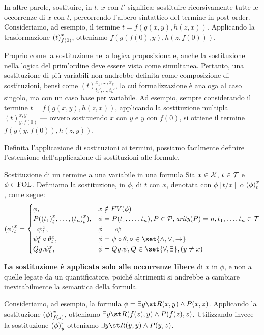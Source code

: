 In altre parole, sostituire, in \(t\), \(x\) con \(t'\) significa: sostituire ricorsivamente tutte le occorrenze di \(x\) con \(t\), percorrendo l'albero sintattico del termine in post-order. 
Consideriamo, ad esempio, il termine \(t = f(g(x,y), h(z,x))\). Applicando la trasformazione \({{\left(t\right)}^{x}_{f(0)}}\), otteniamo \(f(g(f(0),y), h(z,f(0)))\).

Proprio come la sostituzione nella logica proposizionale, anche la sostituzione nella logica del prim'ordine deve essere vista come simultanea.
Pertanto, una sostituzione di più variabili non andrebbe definita come composizione di sostituzioni, bensì come \({(t)}^{x_1,\ldots,x_k}_{t_1',\ldots,t_k'}\), la cui formalizzazione è analoga al caso singolo, ma con un caso base per variabile. 
Ad esempio, sempre considerando il termine \(t = f(g(x,y), h(z,x))\), applicando la sostituzione multipla \({(t)}^{x,y}_{y,f(0)}\) --- ovvero sostituendo \(x\) con \(y\) e \(y\) con \(f(0)\), si ottiene il termine \(f(g(y,f(0)), h(z,y))\).

Definita l'applicazione di sostituzioni ai termini, possiamo facilmente definire l'estensione dell'applicazione di sostituzioni alle formule.

\begin{definition}{Sostituzione di un termine a una variabile in una formula}
  Sia \(x\in\mathcal{X}\), \(t\in\mathcal{T}\) e \(\phi\in\FOL\). Definiamo la sostituzione, in \(\phi\), di \(t\) con \(x\), denotata con \(\phi[t/x]\) o \({{\left(\phi\right)}^{x}_{t}}\), come segue:
  \[\subs{\phi}{x}{t} = \begin{cases}
    \phi, & x \notin FV(\phi)\\
    P({(t_1)}^x_{t}, \ldots, {(t_n)}^x_{t}), & \phi = P(t_1,\ldots,t_n), P\in\PredSyms, \arty(P)=n, t_1,\ldots,t_n \in \Terms\\
    \neg {\psi}^x_{t}, & \phi = \neg \psi\\
    {\psi}^x_{t}\circ{\theta}^x_{t}, & \phi = \psi\circ\theta, \circ\in\set{\land,\lor,\to}\\
    Q y. {\psi}^x_{t}, & \phi = Q y. \psi, Q\in\set{\forall,\exists}, (y\neq x)
  \end{cases}\]
\end{definition}

\textbf{La sostituzione è applicata solo alle occorrenze libere} di \(x\) in \(\phi\), e non a quelle legate da un quantificatore, poiché altrimenti si andrebbe a cambiare inevitabilmente la semantica della formula.

Consideriamo, ad esempio, la formula \(\phi = \exists y\st R(x,y) \land P(x,z)\). Applicando la sostituzione \({{\left(\phi\right)}^{x}_{f(z)}}\), otteniamo \(\exists y\st R(f(z),y) \land P(f(z),z)\).
Utilizzando invece la sostituzione \({{\left(\phi\right)}^{x}_{y}}\) otteniamo \(\exists y\st R(y,y) \land P(y,z)\).

